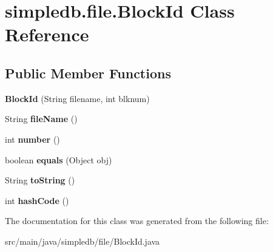\hypertarget{classsimpledb_1_1file_1_1BlockId}{}\section{simpledb.\+file.\+Block\+Id Class Reference}
\label{classsimpledb_1_1file_1_1BlockId}
\subsection*{Public Member Functions}
\begin{DoxyCompactItemize}
\item 
\mbox{\label{classsimpledb_1_1file_1_1BlockId_a62b13e787a84e6d1884eeb081fa48c62}} 
{\bfseries Block\+Id} (String filename, int blknum)
\item 
\mbox{\label{classsimpledb_1_1file_1_1BlockId_aaa3ea8efa284f98f5b3786b017b3a05b}} 
String {\bfseries file\+Name} ()
\item 
\mbox{\label{classsimpledb_1_1file_1_1BlockId_a8a5d501b818a2e1f6b3dd817694f7175}} 
int {\bfseries number} ()
\item 
\mbox{\label{classsimpledb_1_1file_1_1BlockId_ae0531fbb6cf861fd5cdcea1a3497a17b}} 
boolean {\bfseries equals} (Object obj)
\item 
\mbox{\label{classsimpledb_1_1file_1_1BlockId_ac65f9e75b2cae1cbc801c4b588e8a77c}} 
String {\bfseries to\+String} ()
\item 
\mbox{\label{classsimpledb_1_1file_1_1BlockId_a980bd28628f7d7d397db9a2a2d728616}} 
int {\bfseries hash\+Code} ()
\end{DoxyCompactItemize}


The documentation for this class was generated from the following file\+:\begin{DoxyCompactItemize}
\item 
src/main/java/simpledb/file/Block\+Id.\+java\end{DoxyCompactItemize}
